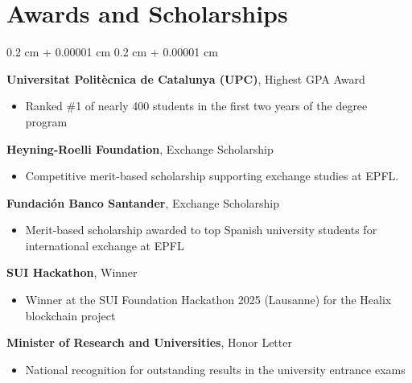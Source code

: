 \documentclass[10pt, letterpaper]{article}
\newenvironment{highlights}{
    \begin{itemize}[
        topsep=0.10 cm,
        parsep=0.10 cm,
        partopsep=0pt,
        itemsep=0pt,
        leftmargin=0.4 cm + 10pt
    ]
}{
    \end{itemize}
} %
\newenvironment{onecolentry}{
    \begin{adjustwidth}{
        0.2 cm + 0.00001 cm
    }{
        0.2 cm + 0.00001 cm
    }
}{
    \end{adjustwidth}
} %
\begin{document}
    \section{Awards and Scholarships}
        \begin{onecolentry}
            \textbf{Universitat Politècnica de Catalunya (UPC)}, Highest GPA Award
            \begin{highlights}
                \item Ranked \#1 of nearly 400 students in the first two years of the degree program
            \end{highlights}
            
            \textbf{Heyning-Roelli Foundation}, Exchange Scholarship
            \begin{highlights}
                \item Competitive merit-based scholarship supporting exchange studies at EPFL.
            \end{highlights}
            
            \textbf{Fundación Banco Santander}, Exchange Scholarship
            \begin{highlights}
                \item Merit-based scholarship awarded to top Spanish university students for international exchange at EPFL
            \end{highlights}
            
            \textbf{SUI Hackathon}, Winner
            \begin{highlights}
                \item Winner at the SUI Foundation Hackathon 2025 (Lausanne) for the Healix blockchain project
            \end{highlights}
            
            \textbf{Minister of Research and Universities}, Honor Letter
            \begin{highlights}
                \item National recognition for outstanding results in the university entrance exams
            \end{highlights}
        \end{onecolentry}




    
\end{document}
